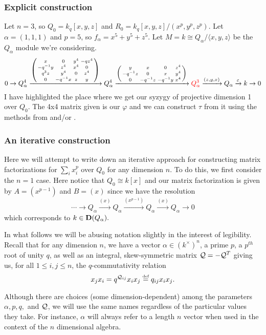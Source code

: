 \documentclass[12pt]{article}
\begin{document}
\subsubsection{Explicit construction}
Let $n=3$, so $Q_0=k_q[x,y,z]$ and $R_0=k_q[x,y,z]/(x^p,y^p,z^p).$ Let $\alpha=(1,1,1)$ and $p=5$, so $f_\alpha=x^5+y^5+z^5.$ Let $M=k\cong Q_\alpha/\langle x, y, z\rangle$ be the $Q_\alpha$ module we're considering. 
\[0\to Q^4_\alpha\xrightarrow{\left(\begin{smallmatrix}x& 0 & y^4 & -qz^4\\-q^{-1}y & z^4 & x^4 & 0\\ q^3z & y^4 & 0 & z^4\\ 0 & -q^{-1}x & z & y\end{smallmatrix}\right)}{Q_\alpha^4}\xrightarrow{\left(\begin{smallmatrix}y & x & 0 & z^4\\-q^{-1}z & 0 & x & y^4\\ 0 & -q^{-1}z & -q^{-1}y & x^4\end{smallmatrix}\right)}{\color{red}Q_\alpha^3}\xrightarrow{(z,y,x)}Q_\alpha\xrightarrow{\varepsilon} k \to 0\]
I have highlighted the place where we get our syzygy of projective dimension 1 over $Q_0$. The 4x4 matrix given is our $\varphi$ and we can construct $\tau$ from it using the methods from \cite{kirkman13} and/or \cite{yoshino90}.

\subsubsection{An iterative construction}\label{sec:resolution-construction}
Here we will attempt to write down an iterative approach for constructing matrix factorizations for $\sum_i x_i^p$ over $Q_0$ for any dimension $n$. To do this, we first consider the $n=1$ case. Here notice that $Q_0\cong k[x]$ and our matrix factorization is given by $A=(x^{p-1})$ and $B=(x)$ since we have the resolution
\[\cdots \to Q_\alpha\xrightarrow{(x)} Q_\alpha\xrightarrow{(x^{p-1})}Q_\alpha \xrightarrow{(x)} Q_\alpha\to 0\]
which corresponds to $k\in \mathbf{D}(Q_\alpha).$
\begin{rmk}
    In what follows we will be abusing notation slightly in the interest of legibility. Recall that for any dimension $n$, we have a vector $\alpha\in(k^\times)^n$, a prime $p$, a $p^{th}$ root of unity $q$, as well as an integral, skew-symmetric matrix $\mathcal{Q}=-\mathcal{Q}^T$ giving us, for all $1\le i,j\le n$, the $q$-commutativity relation 
    \[x_jx_i=q^{\mathcal{Q}_{ij}}x_ix_j\stackrel{\text{\tiny def}}{=} q_{ij}x_ix_j.\]
    
    Although there are choices (some dimension-dependent) among the parameters $\alpha, p, q,$ and $\mathcal{Q}$, we will use the same names regardless of the particular values they take. For instance, $\alpha$ will always refer to a length $n$ vector when used in the context of the $n$ dimensional algebra.
\end{rmk}
\end{document}
